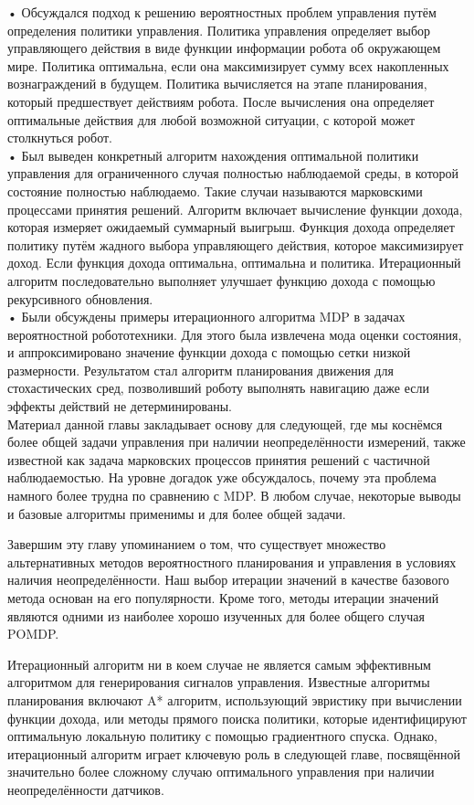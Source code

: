 \documentclass[10pt,a4paper]{article}
\begin{document}
•	Обсуждался подход к решению вероятностных проблем управления путём определения политики управления. Политика управления определяет выбор управляющего действия в виде функции информации робота об окружающем мире. Политика оптимальна, если она максимизирует сумму всех накопленных вознаграждений в будущем. Политика вычисляется на этапе планирования, который предшествует действиям робота. После вычисления она определяет оптимальные действия для любой возможной ситуации, с которой может столкнуться робот.\\

•	Был выведен конкретный алгоритм нахождения оптимальной политики управления для ограниченного случая полностью наблюдаемой среды, в которой состояние полностью наблюдаемо. Такие случаи называются марковскими процессами принятия решений. Алгоритм включает вычисление функции дохода, которая измеряет ожидаемый суммарный выигрыш. Функция дохода определяет политику путём жадного выбора управляющего действия, которое максимизирует доход. Если функция дохода оптимальна, оптимальна и политика. Итерационный алгоритм  последовательно выполняет улучшает функцию дохода с помощью рекурсивного обновления.\\

•	Были обсуждены примеры итерационного алгоритма MDP в задачах вероятностной робототехники. Для этого была извлечена мода оценки состояния, и аппроксимировано значение функции дохода с помощью сетки низкой размерности. Результатом стал алгоритм планирования движения для стохастических сред, позволивший роботу выполнять навигацию даже если эффекты действий не детерминированы.\\

Материал данной главы закладывает основу для следующей, где мы коснёмся более общей задачи управления при наличии неопределённости измерений, также известной как задача марковских процессов принятия решений с частичной наблюдаемостью. На уровне догадок уже обсуждалось, почему эта проблема намного более трудна по сравнению с MDP. В любом случае, некоторые выводы и базовые алгоритмы применимы и для более общей задачи.

Завершим эту главу упоминанием о том, что существует множество альтернативных методов вероятностного планирования и управления в условиях наличия неопределённости. Наш выбор итерации значений в качестве базового метода основан на его популярности. Кроме того, методы итерации значений являются одними из наиболее хорошо изученных для более общего случая POMDP.

Итерационный алгоритм ни в коем случае не является самым эффективным алгоритмом для генерирования сигналов управления. Известные алгоритмы планирования включают A* алгоритм, использующий эвристику при вычислении функции дохода, или методы прямого поиска политики, которые идентифицируют оптимальную локальную политику с помощью градиентного спуска. Однако, итерационный алгоритм играет ключевую роль в следующей главе, посвящённой значительно более сложному случаю оптимального управления при наличии неопределённости датчиков.\\
\end{document}
